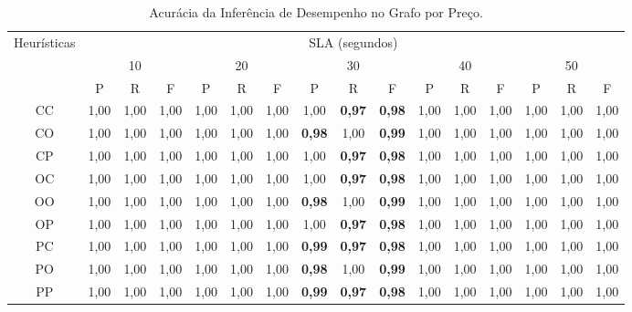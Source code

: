 \begin{table}[t]
  \centering
  {\fontsize{2.4mm}{1em}\selectfont
    \begin{tabular}{|c|c|c|c|c|c|c|c|c|c|c|c|c|c|c|c|}
    \hline          
    \multirow{3}{*}{Heurísticas} & \multicolumn{15}{c|}{SLA (segundos)} \\
    \cline{2-16}
          & \multicolumn{3}{c|}{10} & \multicolumn{3}{c|}{20} & \multicolumn{3}{c|}{30} & \multicolumn{3}{c|}{40} & \multicolumn{3}{c|}{50} \\
          \cline{2-16}
          & P     & R     & F     & P     & R     & F     & P     & R     & F     & P     & R     & F     & P     & R     & F \\
          \hline
    CC    & 1,00  & 1,00  & 1,00  & 1,00  & 1,00  & 1,00  & 1,00  & \textbf{\color{red}0,97}  & \textbf{\color{red}0,98}  & 1,00  & 1,00  & 1,00  & 1,00  & 1,00  & 1,00 \\
    CO    & 1,00  & 1,00  & 1,00  & 1,00  & 1,00  & 1,00  & \textbf{\color{red}0,98}  & 1,00  & \textbf{\color{red}0,99}  & 1,00  & 1,00  & 1,00  & 1,00  & 1,00  & 1,00 \\
    CP    & 1,00  & 1,00  & 1,00  & 1,00  & 1,00  & 1,00  & 1,00  & \textbf{\color{red}0,97}  & \textbf{\color{red}0,98}  & 1,00  & 1,00  & 1,00  & 1,00  & 1,00  & 1,00 \\
    OC    & 1,00  & 1,00  & 1,00  & 1,00  & 1,00  & 1,00  & 1,00  & \textbf{\color{red}0,97}  & \textbf{\color{red}0,98}  & 1,00  & 1,00  & 1,00  & 1,00  & 1,00  & 1,00 \\
    OO    & 1,00  & 1,00  & 1,00  & 1,00  & 1,00  & 1,00  & \textbf{\color{red}0,98}  & 1,00  & \textbf{\color{red}0,99}  & 1,00  & 1,00  & 1,00  & 1,00  & 1,00  & 1,00 \\
    OP    & 1,00  & 1,00  & 1,00  & 1,00  & 1,00  & 1,00  & 1,00  & \textbf{\color{red}0,97}  & \textbf{\color{red}0,98}  & 1,00  & 1,00  & 1,00  & 1,00  & 1,00  & 1,00 \\
    PC    & 1,00  & 1,00  & 1,00  & 1,00  & 1,00  & 1,00  & \textbf{\color{red}0,99}  & \textbf{\color{red}0,97}  & \textbf{\color{red}0,98}  & 1,00  & 1,00  & 1,00  & 1,00  & 1,00  & 1,00 \\
    PO    & 1,00  & 1,00  & 1,00  & 1,00  & 1,00  & 1,00  & \textbf{\color{red}0,98}  & 1,00  & \textbf{\color{red}0,99}  & 1,00  & 1,00  & 1,00  & 1,00  & 1,00  & 1,00 \\
    PP    & 1,00  & 1,00  & 1,00  & 1,00  & 1,00  & 1,00  & \textbf{\color{red}0,99}  & \textbf{\color{red}0,97}  & \textbf{\color{red}0,98}  & 1,00  & 1,00  & 1,00  & 1,00  & 1,00  & 1,00 \\
    \hline
    \end{tabular}%
    }%
  \caption{\label{table:acuracia_preco}Acurácia da Inferência de Desempenho no Grafo por Preço.}
\end{table}%


